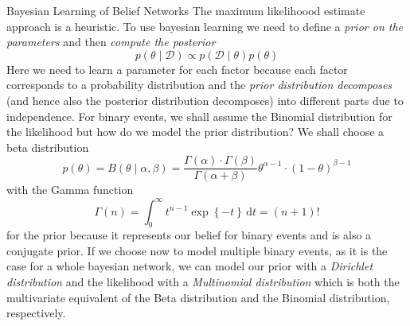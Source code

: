 \newpage
\begin{topic}{.3cm}{Bayesian Learning of Belief Networks}
	The maximum likelihoood estimate approach is a heuristic. %
	To use bayesian learning we need to define a \emph{prior on the parameters} and then \emph{compute the posterior} %
	\begin{equation}
		p(\theta\mid\mathcal{D}) \propto p(\mathcal{D}\mid\theta) p(\theta)
	\end{equation}
	Here we need to learn a parameter for each factor because each factor corresponds to a probability distribution and the \emph{prior distribution decomposes} (and hence also the posterior distribution decomposes) into different parts due to independence. %
	For binary events, we shall assume the Binomial distribution for the likelihood but how do we model the prior distribution? %
	We shall choose a beta distribution %
	\begin{equation}
	p(\theta) %
	= B\left( \theta \middle| \alpha, \beta \right) %
	= \frac{\Gamma(\alpha)\cdot\Gamma(\beta)}{\Gamma(\alpha+\beta)} \theta^{\alpha-1} \cdot (1-\theta)^{\beta-1}
	\end{equation}
	with the Gamma function %
	\begin{equation}
	\Gamma(n) = \int_0^\infty t^{n-1} \exp\left\{-t\right\} \, \mathrm{d}t = (n+1)!
	\end{equation}
	for the prior because it represents our belief for binary events and is also a conjugate prior. %
	If we choose now to model multiple binary events, as it is the case for a whole bayesian network, we can model our prior with a \emph{Dirichlet distribution} and the likelihood with a \emph{Multinomial distribution} which is both the multivariate equivalent of the Beta distribution and the Binomial distribution, respectively. %
\end{topic}
%
%
%
